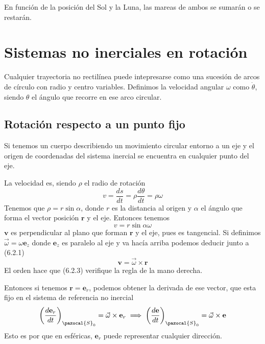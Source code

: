 En función de la posición del Sol y la Luna, las mareas de ambos se sumarán o se restarán.
\section{Sistemas no inerciales en rotación}
Cualquier trayectoria no rectilínea puede intepresarse como una sucesión de arcos de círculo con radio y centro variables. Definimos la velocidad angular $\omega$ como $\dot{\theta}$, siendo $\theta$ el ángulo que recorre en ese arco circular.
\subsection{Rotación respecto a un punto fijo}
\begin{marginfigure}[0pt]
    \def\svgwidth{4 cm}
    \normalsize
	
    \vspace{-30pt}
\end{marginfigure}
\vspace{15pt}
Si tenemos un cuerpo describiendo un movimiento circular entorno a un eje y el origen de coordenadas del sistema inercial se encuentra en cualquier punto del eje.

La velocidad es, siendo $\rho$ el radio de rotación
\begin{equation} \label{6.1.1}
    v = \frac{ds}{dt} = \rho \frac{d\theta}{dt} = \rho \omega
    \end{equation} 
Tenemos que $\rho = r \sin\alpha$, donde $r$ es la distancia al origen y $\alpha$ el ángulo que forma el vector posición $\mathbf{r}$ y el eje.
Entonces tenemos
\begin{equation} \label{6.1.1}
    v =  r \sin\alpha \omega
    \end{equation} 
$\mathbf{v}$ es perpendicular al plano que forman $\mathbf{r}$ y el eje, pues es tangencial. Si definimos $\vec{\omega}=\omega \mathbf{e}_z$ donde $\mathbf{e}_z$ es paralelo al eje y va hacía arriba podemos deducir junto a (6.2.1)
\begin{equation} \label{6.1.1}
    \mathbf{v} =  \vec{\omega} \times \mathbf{r}
    \end{equation} 
El orden hace que (6.2.3) verifique la regla de la mano derecha.

Entonces si tenemos $\mathbf{r}=\mathbf{e}_r$, podemos obtener la derivada de ese vector, que esta fijo en el sistema de referencia no inercial
\begin{equation} \label{6.1.1}
    \left(\frac{d \mathbf{e}_r}{dt}\right)_{\pazocal{S}_0} =  \vec{\omega} \times \mathbf{e}_r \implies \left(\frac{d \mathbf{e}}{dt}\right)_{\pazocal{S}_0} =  \vec{\omega} \times \mathbf{e}
    \end{equation} 
Esto es por que en esféricas, $\mathbf{e}_r$ puede representar cualquier dirección.

